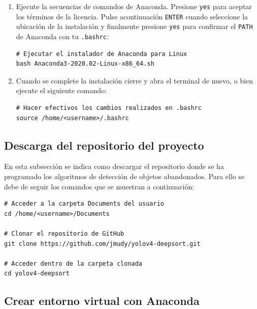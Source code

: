 \begin{enumerate}
\item Ejecute la secuencias de comandos de Anaconda. Presione \texttt{yes} para aceptar los términos de la licencia. Pulse acontinuación \texttt{ENTER} cuando seleccione la ubicación de la instalación y finalmente presione \texttt{yes} para confirmar el \texttt{PATH} de Anaconda con tu \texttt{.bashrc}:
\vspace{0.5cm}
\begin{lstlisting}[language=iPython,caption=Ejecutar el instalador de Anaconda para Linux,captionpos=b,label={lst:install-conda}]
# Ejecutar el instalador de Anaconda para Linux
bash Anaconda3-2020.02-Linux-x86_64.sh
\end{lstlisting}

\item Cuando se complete la instalación cierre y abra el terminal de nuevo, o bien ejecute el siguiente comando:
\vspace{0.5cm}
\begin{lstlisting}[language=iPython,caption=Hacer efectivo los cambios en el fichero .bashrc,captionpos=b,label={lst:source-bashrc}]
# Hacer efectivos los cambios realizados en .bashrc
source /home/<username>/.bashrc
\end{lstlisting}

\end{enumerate}

\subsection{Descarga del repositorio del proyecto}
\label{subsec:descarga-repo}
En esta subsección se indica como descargar el repositorio donde se ha programado los algoritmos de detección de objetos abandonados. Para ello se debe de seguir los comandos que se muestran a continuación:

\vspace{0.5cm}
\begin{lstlisting}[language=iPython,caption=Descarga repositorio,captionpos=b,label={lst:descarga-repo}]
# Acceder a la carpeta Documents del usuario
cd /home/<username>/Documents

# Clonar el repositorio de GitHub
git clone https://github.com/jmudy/yolov4-deepsort.git

# Acceder dentro de la carpeta clonada
cd yolov4-deepsort
\end{lstlisting}

\subsection{Crear entorno virtual con Anaconda}
\label{subsec:creacion-entorno}

